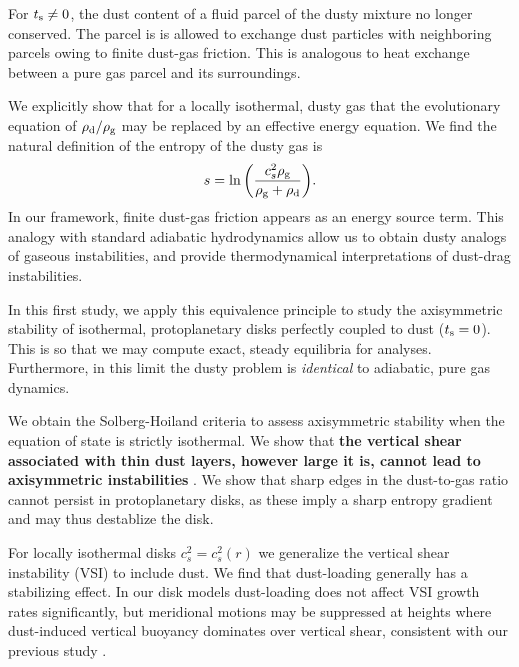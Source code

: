 For $t_\mathrm{s}\neq 0$, the dust content of a
fluid parcel of the dusty mixture no longer conserved. The parcel is
is allowed to exchange dust particles with neighboring parcels owing
to finite dust-gas friction. This is analogous to heat exchange between a 
pure gas parcel and its surroundings. %

We explicitly show that for a locally isothermal, dusty gas that the
evolutionary equation of  $\rho_\mathrm{d}/\rho_\mathrm{g}$ may be replaced by an 
effective energy equation. We find the 
natural definition of the entropy of the dusty gas is 
\begin{align*}
  s  = \ln{\left(\frac{c_s^2\rho_\mathrm{g}}{\rho_\mathrm{g}+\rho_\mathrm{d}}\right)}.  
\end{align*}
In our framework, finite dust-gas friction appears as an energy
source term.  This analogy with standard adiabatic
hydrodynamics allow us to obtain dusty analogs of gaseous
instabilities, and provide thermodynamical interpretations of  
dust-drag instabilities. 

%
In this first study, we apply this equivalence principle to study the
axisymmetric stability of isothermal, protoplanetary disks
perfectly coupled to dust ($t_\mathrm{s}=0$). This is so that we may 
compute exact, steady equilibria for analyses. Furthermore, 
in this limit the dusty problem is \emph{identical} to adiabatic, pure
gas dynamics. 

We obtain the Solberg-Hoiland criteria to assess 
axisymmetric stability when the equation of state is strictly
isothermal. We show that {\bf the vertical shear associated with thin dust
 layers, however large it is, cannot lead to axisymmetric
  instabilities} \citep[cf. \emph{non-axisymmetric} Kelvin-Helmholtz instabilities
  in dusty disks, ][]{lee10}. We show that
sharp edges in the dust-to-gas ratio cannot persist in protoplanetary
disks, as these imply a sharp entropy gradient and may thus destablize
the disk. 


For locally isothermal disks $c^2_s=c_s^2(r)$ we generalize the vertical
shear instability (VSI) to include dust. We find that dust-loading
generally has a stabilizing effect. In our disk models
dust-loading does not affect VSI growth rates significantly, but
meridional motions may be suppressed at heights where dust-induced
vertical buoyancy dominates over vertical shear, consistent with our
previous study \citep{lin15}.  

